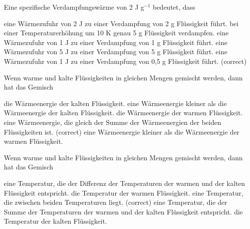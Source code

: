 \documentclass[11pt]{exam}
\begin{document}
\setlength{\voffset}{-0.5in}
\setlength{\headsep}{5pt}

\hspace{2mm}
 \hspace{5mm}
\vspace{4mm}

\begin{questions}

\question Eine spezifische Verdampfungswärme von 2 J g\(^{-1}\) bedeutet, dass

\begin{choices}
	\choice eine Wärmezufuhr von 2 J zu einer Verdampfung von 2 g Flüssigkeit führt.
	\choice bei einer Temperaturerhöhung um 10 K genau 5 g Flüssigkeit verdampfen.
	\choice eine Wärmezufuhr von 1 J zu einer Verdampfung von 1 g Flüssigkeit führt.
	\choice eine Wärmezufuhr von 5 J zu einer Verdampfung von 5 g Flüssigkeit führt.
	\choice eine Wärmezufuhr von 1 J zu einer Verdampfung von 0,5 g Flüssigkeit führt. (correct)
\end{choices}

\vspace{3mm}\question Wenn warme und kalte Flüssigkeiten in gleichen Mengen gemischt werden, dann hat das Gemisch

\begin{choices}
	\choice die Wärmeenergie der kalten Flüssigkeit.
	\choice eine Wärmeenergie kleiner als die Wärmeenergie der kalten Flüssigkeit.
	\choice die Wärmeenergie der warmen Flüssigkeit.
	\choice eine Wärmeenergie, die gleich der Summe der Wärmeenergien der beiden Flüssigkeiten ist. (correct)
	\choice eine Wärmeenergie kleiner als die Wärmeenergie der warmen Flüssigkeit.
\end{choices}

\vspace{3mm}\question Wenn warme und kalte Flüssigkeiten in gleichen Mengen gemischt werden, dann hat das Gemisch

\begin{choices}
	\choice eine Temperatur, die der Differenz der Temperaturen der warmen und der kalten Flüssigkeit entspricht.
	\choice die Temperatur der warmen Flüssigkeit.
	\choice eine Temperatur, die zwischen beiden Temperaturen liegt. (correct)
	\choice eine Temperatur, die der Summe der Temperaturen der warmen und der kalten Flüssigkeit entspricht.
	\choice die Temperatur der kalten Flüssigkeit.
\end{choices}


\end{questions}
\end{document}
